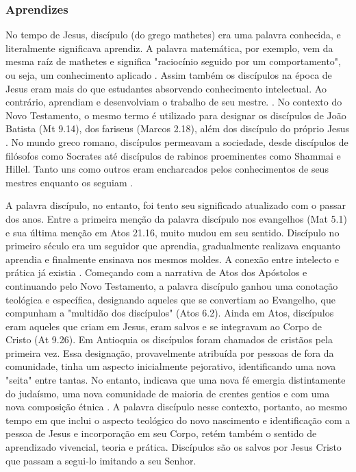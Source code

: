 \documentclass[
	12pt,				%
	openright,			%
	twoside,			%
	a4paper,			%
	english,			%
	french,				%
	spanish,			%
	brazil				%
	]{abntex2}
\begin{document}
\subsubsection{Aprendizes}

No tempo de Jesus, discípulo (do grego mathetes) era uma palavra conhecida, e literalmente significava aprendiz. A palavra matemática, por exemplo, vem da mesma raíz de mathetes e significa "raciocínio seguido por um comportamento", ou seja, um conhecimento aplicado \cite[15]{gtsm}. Assim também os discípulos na época de Jesus eram mais do que estudantes absorvendo conhecimento intelectual. Ao contrário, aprendiam e desenvolviam o trabalho de seu mestre. \cite[15]{gtsm}. No contexto do Novo Testamento, o mesmo termo é utilizado para designar os discípulos de João Batista (Mt 9.14), dos fariseus (Marcos 2.18), além dos discípulo do próprio Jesus \cite[59]{brandao}. No mundo greco romano, discípulos permeavam a sociedade, desde discípulos de filósofos como Socrates até discípulos de rabinos proeminentes como Shammai e Hillel. Tanto uns como outros eram encharcados pelos conhecimentos de seus mestres enquanto os seguiam \cite[209]{shirley}.

A palavra discípulo, no entanto, foi tento seu significado atualizado com o passar dos anos. Entre a primeira menção da palavra discípulo nos evangelhos (Mat 5.1) e sua última menção em Atos 21.16, muito mudou em seu sentido. Discípulo no primeiro século era um seguidor que aprendia, gradualmente realizava enquanto aprendia e finalmente ensinava nos mesmos moldes. A conexão entre intelecto e prática já existia \cite[105]{wilkins}. Começando com a narrativa de Atos dos Apóstolos e continuando pelo Novo Testamento, a palavra discípulo ganhou uma conotação teológica e específica, designando aqueles que se convertiam ao Evangelho, que compunham a "multidão dos discípulos" (Atos 6.2). Ainda em Atos, discípulos eram aqueles que criam em Jesus, eram salvos e se integravam ao Corpo de Cristo (At 9.26)\cite[59-60]{brandao}. Em Antioquia os discípulos foram chamados de cristãos pela primeira vez. Essa designação, provavelmente atribuída por pessoas de fora da comunidade, tinha um aspecto inicialmente pejorativo, identificando uma nova "seita" entre tantas. No entanto, indicava que uma nova fé emergia distintamente do judaísmo, uma nova comunidade de maioria de crentes gentios e com uma nova composição étnica \cite[90]{wan_diaspora_2011}. A palavra discípulo nesse contexto, portanto, ao mesmo tempo em que inclui o aspecto teológico do novo nascimento e identificação com a pessoa de Jesus e incorporação em seu Corpo, retém também o sentido de aprendizado vivencial, teoria e prática. Discípulos são os salvos por Jesus Cristo que passam a segui-lo imitando a seu Senhor.
\end{document}
